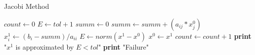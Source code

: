 \documentclass{article}
\begin{document}
  \begin{algorithm}
    \caption{Jacobi Method}
    \begin{algorithmic}[1]
        \State $count \gets 0$
        \State $E \gets tol + 1$
            \State $summ \gets 0$
                \State $summ \gets summ + (a_{ij} * x_{j}^{0})$
              \EndIf
            \EndFor
            \State $x_{i}^{1} \gets (b_{i} - summ) / a_{ii}$
          \EndFor
          \State $E \gets norm(x^{1} - x^{0})$
          \State $x^{0} \gets x^{1}$
          \State $count \gets count + 1$
        \EndWhile
          \State \textbf{print} "$x^{1}$ is approximated by $E < tol$"
        \Else
            \State \textbf{print} "Failure"
        \EndIf
      \EndProcedure
    \end{algorithmic}
  \end{algorithm}
\end{document}
